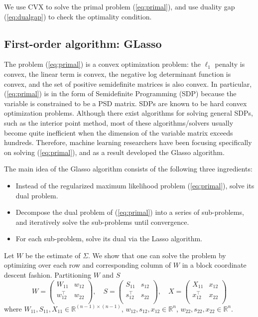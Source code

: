 \documentclass[conference,onecolumn,12pt]{IEEEtran}
\newcommand{\R}{\mathbb{R}}
\newcommand{\<}{\langle}
\renewcommand{\>}{\rangle}
\numberwithin{equation}{section}
\begin{document}
We use CVX to solve the primal problem (\ref{eq:primal}), and use duality
gap (\ref{eq:dualgap}) to check the optimality condition.
\subsection{First-order algorithm: GLasso}

The problem (\ref{eq:primal}) is a convex optimization problem: the $\ell_1$ penalty is convex, the linear term is convex, the
negative log determinant function is convex, and the set of positive semidefinite matrices is also convex. In particular, (\ref{eq:primal}) is in the form of Semidefinite Programming (SDP) because the
variable is constrained to be a PSD matrix. SDPs are known to be hard convex optimization problems. Although there exist algorithms for solving general SDPs, such as the interior point method, most of these algorithms/solvers usually become quite inefficient when the
dimension of the variable matrix exceeds hundreds. Therefore, machine learning researchers have been focusing specifically on solving (\ref{eq:primal}), and as a result developed the Glasso algorithm. \cite{friedman2008sparse}

The main idea of the Glasso algorithm consists of the following three ingredients:
\begin{itemize}
    \item Instead of the regularized maximum likelihood problem (\ref{eq:primal}), solve its dual problem.
    \item Decompose the dual problem of (\ref{eq:primal}) into a series of sub-problems, and iteratively solve the sub-problems until convergence.
    \item For each sub-problem, solve its dual via the Lasso algorithm.
\end{itemize}

Let $W$ be the estimate of $\Sigma$. We show that one can solve the problem by optimizing over each row and corresponding column of $W$ in a block coordinate descent fashion. Partitioning $W$ and $S$
\begin{equation}
    W = \left(\begin{matrix}
        W_{11}&w_{12}\\
        w_{12}^\top &w_{22}\\
    \end{matrix}\right),\quad S = \left(\begin{matrix}
        S_{11}&s_{12}\\
        s_{12}^\top &s_{22}\\
    \end{matrix}\right), \quad X = \left(\begin{matrix}
        X_{11}&x_{12}\\
        x_{12}^\top &x_{22}\\
    \end{matrix}\right)
    \label{eq:partition}
\end{equation}
where $W_{11}, S_{11}, X_{11}\in \R^{(n-1)\times (n-1)}$, $w_{12}, s_{12}, x_{12}\in \R^n$, $w_{22}, s_{22}, x_{22}\in \R^n$.
\end{document}
